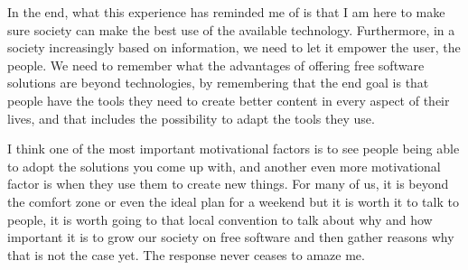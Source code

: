 In the end, what this experience has reminded me of is that I am here to make sure society can make the best use of the available technology. Furthermore, in a society increasingly based on information, we need to let it empower the user, the people. We need to remember what the advantages of offering free software solutions are beyond technologies, by remembering that the end goal is that people have the tools they need to create better content in every aspect of their lives, and that includes the possibility to adapt the tools they use.

I think one of the most important motivational factors is to see people being able to adopt the solutions you come up with, and another even more motivational factor is when they use them to create new things. For many of us, it is beyond the comfort zone or even the ideal plan for a weekend but it is worth it to talk to people, it is worth going to that local convention to talk about why and how important it is to grow our society on free software and then gather reasons why that is not the case yet. The response never ceases to amaze me.
